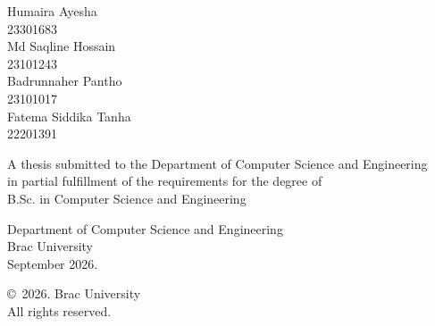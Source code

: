 \begin{titlepage}
\renewcommand*{\thepage}{Title} %

    \begin{center} 
        \vspace*{3cm} %
        
        {\fontsize{16pt}{22pt}\selectfont{UniAdapFuse: Reliability-Aware Multimodal Fusion for UAV Disaster Perception}
        } %
        
        \vspace{1.5cm}
        
        
        \vspace{0.5cm}
        
        	Humaira Ayesha\\
	        23301683\\
	        Md Saqline Hossain\\
	        23101243\\
	        Badrunnaher Pantho\\
	        23101017\\
	        Fatema Siddika Tanha\\
	        22201391

        \vspace{1.5cm}
        
        	A thesis submitted to the Department of Computer Science and Engineering\\
            in partial fulfillment of the requirements for the degree of\\
            B.Sc. in Computer Science and Engineering

        
        \vspace{2.5cm}
        
    		Department of Computer Science and Engineering\\
            Brac University\\
            September 2026.
        
        \vspace{3cm}
        
    		\copyright\ 2026. Brac University\\
            All rights reserved.
    
    \end{center}

\end{titlepage}

